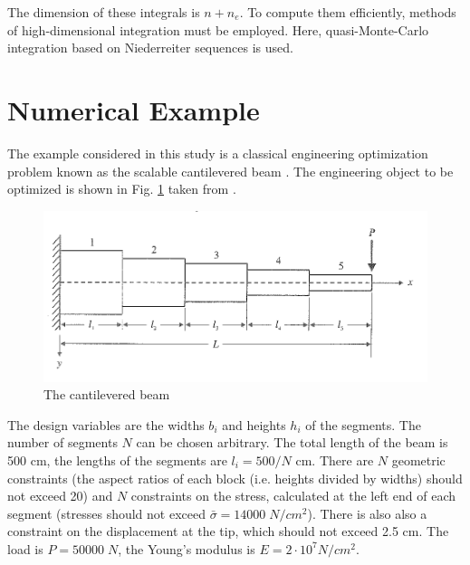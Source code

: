 \documentclass{llncs}
\begin{document}
The dimension of these integrals is $n+n_e$. To compute them efficiently, methods of high-dimensional integration must be employed. Here, quasi-Monte-Carlo integration \cite{Caflisch1998} based on Niederreiter sequences \cite{Niederreiter1992} is used.

\section{Numerical Example}
\label{sec:num_example}

The example considered in this study is a classical engineering optimization problem known as the scalable cantilevered beam \cite{Vanderpllaats2001}. The engineering object to be optimized is shown in Fig. \ref{fig:beam} taken from \cite{Vanderpllaats2001}.

\begin{figure}[ht]
    \centering
    \includegraphics[width=1.0\textwidth]{beam.png}
    \caption{The cantilevered beam}
    \label{fig:beam}
\end{figure}

The design variables are the widths $b_i$ and heights $h_i$ of the segments. The number of segments $N$ can be chosen arbitrary. The total length of the beam is 500 cm, the lengths of the segments are $l_i=500/N$  cm. There are $N$ geometric constraints (the aspect ratios of each block (i.e. heights divided by widths) should not exceed 20) and $N$ constraints on the stress, calculated at the left end of each segment (stresses should not exceed  $\bar{\sigma}=14000\; N/cm^2$). There is also also a constraint on the displacement at the tip, which should not exceed 2.5 cm. The load is $P = 50 000\; N$, the Young's modulus is $E=2\cdot 10^7  N/cm^2$.
\end{document}

